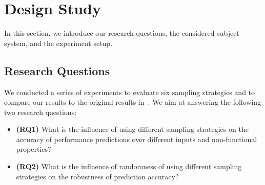 \vspace*{-2mm}
\section{Design Study} \label{sec:study_design}

In this section, we introduce our research questions, the considered subject system, and the experiment setup.

\subsection{Research Questions} \label{research_questions}

We conducted a series of experiments to evaluate six sampling strategies and to compare our results to the original results in~\cite{kaltenecker2019}. We aim at answering the following two research questions:  

\begin{itemize}
    \item \textbf{(RQ1)} What is the influence of using different sampling strategies on the accuracy of performance predictions over different inputs and non-functional properties?
    
    
    \item \textbf{(RQ2)} What is the influence of randomness of using different sampling strategies on the robustness of prediction accuracy?
\end{itemize}


